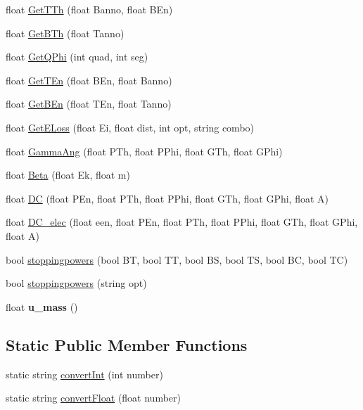 \begin{DoxyCompactItemize}
float \hyperlink{classdoppler_a7865dcf92a6b18d23cb48e9e624e505b}{Get\+T\+Th} (float Banno, float B\+En)
\item 
float \hyperlink{classdoppler_ac834d80156ae80009b508ae41fedde3d}{Get\+B\+Th} (float Tanno)
\item 
float \hyperlink{classdoppler_a7c3afd05ed9ddb8c5bedc0de905acd0b}{Get\+Q\+Phi} (int quad, int seg)
\item 
float \hyperlink{classdoppler_a31a09afe8920dc1302162ec8e0be9302}{Get\+T\+En} (float B\+En, float Banno)
\item 
float \hyperlink{classdoppler_a182d987ddc6db4a8b8e7f7821bda3846}{Get\+B\+En} (float T\+En, float Tanno)
\item 
float \hyperlink{classdoppler_a64570ec784dabd6e17cf836489450527}{Get\+E\+Loss} (float Ei, float dist, int opt, string combo)
\item 
float \hyperlink{classdoppler_a6dca381f91f2267abefadd62cf66f69f}{Gamma\+Ang} (float P\+Th, float P\+Phi, float G\+Th, float G\+Phi)
\item 
float \hyperlink{classdoppler_a28eb084d224fdb58fda1d6f6c61dd232}{Beta} (float Ek, float m)
\item 
float \hyperlink{classdoppler_a7f08d93d2bfa269f8c22ac71b604b09a}{DC} (float P\+En, float P\+Th, float P\+Phi, float G\+Th, float G\+Phi, float A)
\item 
float \hyperlink{classdoppler_ad8387753c2288d464b64579a23d3bc4e}{D\+C\+\_\+elec} (float een, float P\+En, float P\+Th, float P\+Phi, float G\+Th, float G\+Phi, float A)
\item 
bool \hyperlink{classdoppler_a0ab0f803a7ab47bf2d087ee973ccdbc3}{stoppingpowers} (bool BT, bool TT, bool BS, bool TS, bool BC, bool TC)
\item 
bool \hyperlink{classdoppler_a4be762591578e28f8e9d646475ca943a}{stoppingpowers} (string opt)
\item 
\mbox{\label{classdoppler_a68d168fdd3cb3edeb4a015aeaf0d3391}} 
float {\bfseries u\+\_\+mass} ()
\end{DoxyCompactItemize}
\subsection*{Static Public Member Functions}
\begin{DoxyCompactItemize}
\item 
static string \hyperlink{classdoppler_a100e363bf80b5371baebb89bbf60b824}{convert\+Int} (int number)
\item 
static string \hyperlink{classdoppler_a0fa8eec8989c81e59ecfb8e09140020c}{convert\+Float} (float number)
\end{DoxyCompactItemize}
